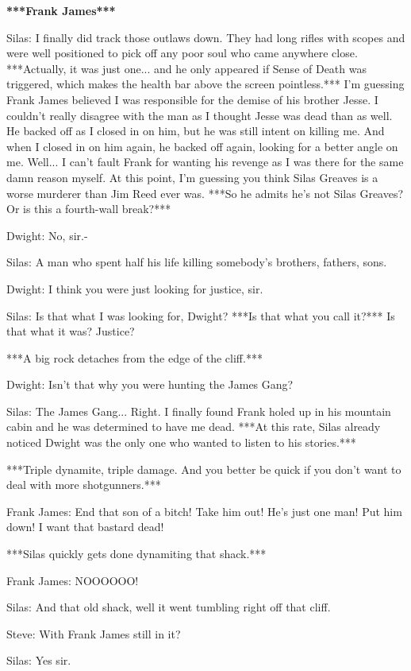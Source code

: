 \documentclass{article}
\begin{document}
\textbf{***Frank James***}

Silas: I finally did track those outlaws down. They had long rifles with scopes and were well positioned to pick off any poor soul who came anywhere close. ***Actually, it was just one... and he only appeared if Sense of Death was triggered, which makes the health bar above the screen pointless.*** I'm guessing Frank James believed I was responsible for the demise of his brother Jesse. I couldn't really disagree with the man as I thought Jesse was dead than as well. He backed off as I closed in on him, but he was still intent on killing me. And when I closed in on him again, he backed off again, looking for a better angle on me. Well... I can't fault Frank for wanting his revenge as I was there for the same damn reason myself. At this point, I'm guessing you think Silas Greaves is a worse murderer than Jim Reed ever was. ***So he admits he's not Silas Greaves? Or is this a fourth-wall break?***

Dwight: No, sir.-

Silas: A man who spent half his life killing somebody's brothers, fathers, sons.

Dwight: I think you were just looking for justice, sir.

Silas: Is that what I was looking for, Dwight? ***Is that what you call it?*** Is that what it was? Justice?

***A big rock detaches from the edge of the cliff.***

Dwight: Isn't that why you were hunting the James Gang?

Silas: The James Gang... Right. I finally found Frank holed up in his mountain cabin and he was determined to have me dead. ***At this rate, Silas already noticed Dwight was the only one who wanted to listen to his stories.***

***Triple dynamite, triple damage. And you better be quick if you don't want to deal with more shotgunners.***

Frank James: End that son of a bitch! Take him out! He's just one man! Put him down! I want that bastard dead!

***Silas quickly gets done dynamiting that shack.***

Frank James: NOOOOOO!

Silas: And that old shack, well it went tumbling right off that cliff.

Steve: With Frank James still in it?

Silas: Yes sir.
\end{document}
